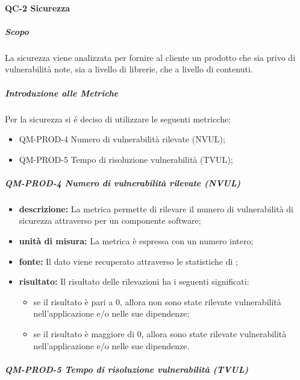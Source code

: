 

		\paragraph{QC-2 Sicurezza}
		\subparagraph{Scopo}
			La sicurezza viene analizzata per fornire al cliente un prodotto che sia privo di vulnerabilità note, sia a livello di librerie, che a livello di contenuti.
		\subparagraph{Introduzione alle Metriche}
			Per la sicurezza si é deciso di utilizzare le seguenti metricche:
			\begin{itemize}
				\item QM-PROD-4 Numero di vulnerabilità rilevate (NVUL);
				\item QM-PROD-5 Tempo di risoluzione vulnerabilità (TVUL);
			\end{itemize}
			\subparagraph{ QM-PROD-4 Numero di vulnerabilità rilevate (NVUL)}
			\begin{itemize}
      			\item \textbf{descrizione: }
					La metrica permette di rilevare il numero di vulnerabilità di sicurezza attraverso  per un componente software;
				\item \textbf{unità di misura: }
					La metrica è espressa con un numero intero;
				\item \textbf{fonte: }
					Il dato viene recuperato attraverso le statistiche di ;
				\item \textbf{risultato: }
					Il risultato delle rilevazioni ha i seguenti significati:
					\begin{itemize}
						\item se il risultato è pari a 0, allora non sono state rilevate vulnerabilità nell'applicazione e/o nelle sue dipendenze;
						\item se il risultato è maggiore di 0, allora sono state rilevate vulnerabilità nell'applicazione e/o nelle sue dipendenze.
					\end{itemize}
			\end{itemize}
			\subparagraph{ QM-PROD-5 Tempo di risoluzione vulnerabilità (TVUL) }

